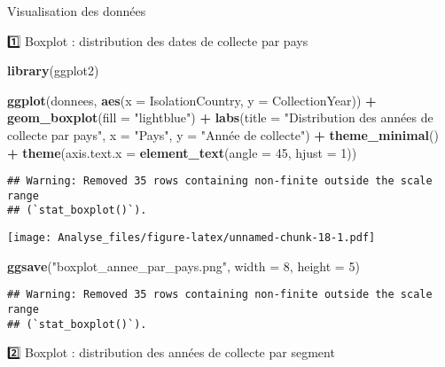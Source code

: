 \documentclass[
]{article}
\newenvironment{Shaded}{\begin{snugshade}}{\end{snugshade}}
\newcommand{\AttributeTok}[1]{\textcolor[rgb]{0.13,0.29,0.53}{#1}}
\newcommand{\DecValTok}[1]{\textcolor[rgb]{0.00,0.00,0.81}{#1}}
\newcommand{\FunctionTok}[1]{\textcolor[rgb]{0.13,0.29,0.53}{\textbf{#1}}}
\newcommand{\NormalTok}[1]{#1}
\newcommand{\SpecialCharTok}[1]{\textcolor[rgb]{0.81,0.36,0.00}{\textbf{#1}}}
\newcommand{\StringTok}[1]{\textcolor[rgb]{0.31,0.60,0.02}{#1}}
\begin{document}
Visualisation des données

1️⃣ Boxplot : distribution des dates de collecte par pays

\begin{Shaded}
\begin{Highlighting}[]
\FunctionTok{library}\NormalTok{(ggplot2)}

\FunctionTok{ggplot}\NormalTok{(donnees, }\FunctionTok{aes}\NormalTok{(}\AttributeTok{x =}\NormalTok{ IsolationCountry, }\AttributeTok{y =}\NormalTok{ CollectionYear)) }\SpecialCharTok{+}
  \FunctionTok{geom\_boxplot}\NormalTok{(}\AttributeTok{fill =} \StringTok{"lightblue"}\NormalTok{) }\SpecialCharTok{+}
  \FunctionTok{labs}\NormalTok{(}\AttributeTok{title =} \StringTok{"Distribution des années de collecte par pays"}\NormalTok{,}
       \AttributeTok{x =} \StringTok{"Pays"}\NormalTok{,}
       \AttributeTok{y =} \StringTok{"Année de collecte"}\NormalTok{) }\SpecialCharTok{+}
  \FunctionTok{theme\_minimal}\NormalTok{() }\SpecialCharTok{+}
  \FunctionTok{theme}\NormalTok{(}\AttributeTok{axis.text.x =} \FunctionTok{element\_text}\NormalTok{(}\AttributeTok{angle =} \DecValTok{45}\NormalTok{, }\AttributeTok{hjust =} \DecValTok{1}\NormalTok{))}
\end{Highlighting}
\end{Shaded}

\begin{verbatim}
## Warning: Removed 35 rows containing non-finite outside the scale range
## (`stat_boxplot()`).
\end{verbatim}

\texttt{[image: Analyse\_files/figure-latex/unnamed-chunk-18-1.pdf]}

\begin{Shaded}
\begin{Highlighting}[]
\FunctionTok{ggsave}\NormalTok{(}\StringTok{"boxplot\_annee\_par\_pays.png"}\NormalTok{, }\AttributeTok{width =} \DecValTok{8}\NormalTok{, }\AttributeTok{height =} \DecValTok{5}\NormalTok{)}
\end{Highlighting}
\end{Shaded}

\begin{verbatim}
## Warning: Removed 35 rows containing non-finite outside the scale range
## (`stat_boxplot()`).
\end{verbatim}

2️⃣ Boxplot : distribution des années de collecte par segment
\end{document}

